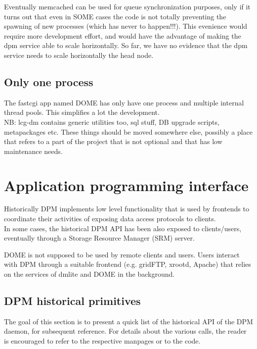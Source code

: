 \documentclass[a4paper,10pt]{scrreprt}
\begin{document}
Eventually memcached can be used for queue synchronization purposes, only if it turns out that even in SOME cases the code is not totally
preventing the spawning of new processes (which has never to happen!!!). This evenience would require more development effort, and would have the
advantage of making the dpm service able to scale horizontally. So far, we have no evidence that the dpm service needs to scale horizontally the head node.\\

\subsection{Only one process}
 The fastcgi app named DOME has only have one process and multiple internal thread pools. This simplifies a lot the development.\\




 NB: lcg-dm contains generic utilities too, sql stuff, DB upgrade scripts, metapackages etc. These things should be moved somewhere else,
 possibly a place that refers to a part of the project that is not optional and that has low maintenance needs.\\



\section{Application programming interface}

Historically DPM implements low level functionality that is used by frontends to coordinate
their activities of exposing data access protocols to clients.\\
In some cases, the historical DPM API has been also exposed to clients/users, eventually through a
Storage Resource Manager (SRM) server.

DOME is not supposed to be used by remote clients and users. Users interact with DPM through a suitable frontend (e.g. gridFTP, xrootd, Apache) that
relies on the services of dmlite and DOME in the background.

\subsection{DPM historical primitives}
 The goal of this section is to present a quick list of the historical API of the DPM daemon, for subsequent reference.
 For details about the various calls, the reader is encouraged to refer to the respective manpages or to the code.
\end{document}
